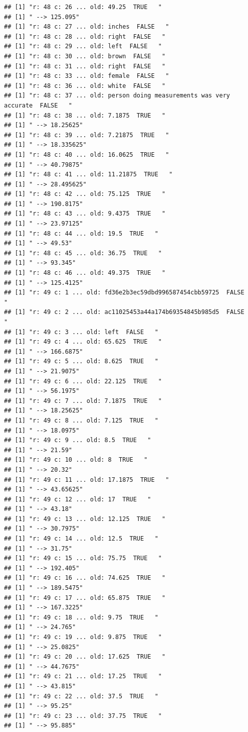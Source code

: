 \documentclass[]{article}
\begin{document}
\begin{verbatim}
## [1] "r: 48 c: 26 ... old: 49.25  TRUE   "
## [1] " --> 125.095"
## [1] "r: 48 c: 27 ... old: inches  FALSE   "
## [1] "r: 48 c: 28 ... old: right  FALSE   "
## [1] "r: 48 c: 29 ... old: left  FALSE   "
## [1] "r: 48 c: 30 ... old: brown  FALSE   "
## [1] "r: 48 c: 31 ... old: right  FALSE   "
## [1] "r: 48 c: 33 ... old: female  FALSE   "
## [1] "r: 48 c: 36 ... old: white  FALSE   "
## [1] "r: 48 c: 37 ... old: person doing measurements was very accurate  FALSE   "
## [1] "r: 48 c: 38 ... old: 7.1875  TRUE   "
## [1] " --> 18.25625"
## [1] "r: 48 c: 39 ... old: 7.21875  TRUE   "
## [1] " --> 18.335625"
## [1] "r: 48 c: 40 ... old: 16.0625  TRUE   "
## [1] " --> 40.79875"
## [1] "r: 48 c: 41 ... old: 11.21875  TRUE   "
## [1] " --> 28.495625"
## [1] "r: 48 c: 42 ... old: 75.125  TRUE   "
## [1] " --> 190.8175"
## [1] "r: 48 c: 43 ... old: 9.4375  TRUE   "
## [1] " --> 23.97125"
## [1] "r: 48 c: 44 ... old: 19.5  TRUE   "
## [1] " --> 49.53"
## [1] "r: 48 c: 45 ... old: 36.75  TRUE   "
## [1] " --> 93.345"
## [1] "r: 48 c: 46 ... old: 49.375  TRUE   "
## [1] " --> 125.4125"
## [1] "r: 49 c: 1 ... old: fd36e2b3ec59dbd996587454cbb59725  FALSE   "
## [1] "r: 49 c: 2 ... old: ac11025453a44a174b69354845b985d5  FALSE   "
## [1] "r: 49 c: 3 ... old: left  FALSE   "
## [1] "r: 49 c: 4 ... old: 65.625  TRUE   "
## [1] " --> 166.6875"
## [1] "r: 49 c: 5 ... old: 8.625  TRUE   "
## [1] " --> 21.9075"
## [1] "r: 49 c: 6 ... old: 22.125  TRUE   "
## [1] " --> 56.1975"
## [1] "r: 49 c: 7 ... old: 7.1875  TRUE   "
## [1] " --> 18.25625"
## [1] "r: 49 c: 8 ... old: 7.125  TRUE   "
## [1] " --> 18.0975"
## [1] "r: 49 c: 9 ... old: 8.5  TRUE   "
## [1] " --> 21.59"
## [1] "r: 49 c: 10 ... old: 8  TRUE   "
## [1] " --> 20.32"
## [1] "r: 49 c: 11 ... old: 17.1875  TRUE   "
## [1] " --> 43.65625"
## [1] "r: 49 c: 12 ... old: 17  TRUE   "
## [1] " --> 43.18"
## [1] "r: 49 c: 13 ... old: 12.125  TRUE   "
## [1] " --> 30.7975"
## [1] "r: 49 c: 14 ... old: 12.5  TRUE   "
## [1] " --> 31.75"
## [1] "r: 49 c: 15 ... old: 75.75  TRUE   "
## [1] " --> 192.405"
## [1] "r: 49 c: 16 ... old: 74.625  TRUE   "
## [1] " --> 189.5475"
## [1] "r: 49 c: 17 ... old: 65.875  TRUE   "
## [1] " --> 167.3225"
## [1] "r: 49 c: 18 ... old: 9.75  TRUE   "
## [1] " --> 24.765"
## [1] "r: 49 c: 19 ... old: 9.875  TRUE   "
## [1] " --> 25.0825"
## [1] "r: 49 c: 20 ... old: 17.625  TRUE   "
## [1] " --> 44.7675"
## [1] "r: 49 c: 21 ... old: 17.25  TRUE   "
## [1] " --> 43.815"
## [1] "r: 49 c: 22 ... old: 37.5  TRUE   "
## [1] " --> 95.25"
## [1] "r: 49 c: 23 ... old: 37.75  TRUE   "
## [1] " --> 95.885"

\end{verbatim}
\end{document}
